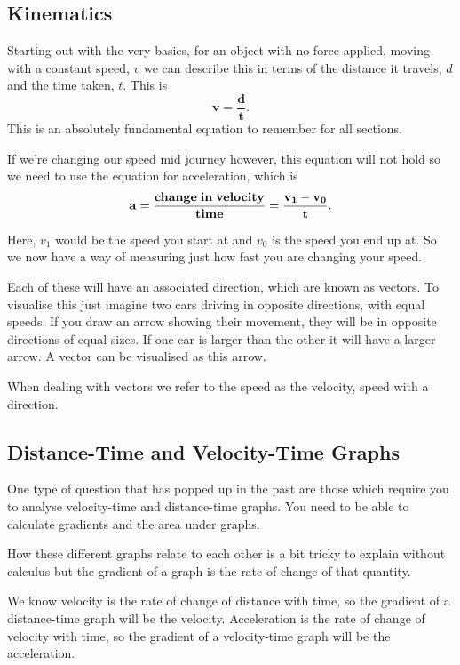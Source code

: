 \documentclass[11pt, titlepage]{article}
\begin{document}
\subsection{Kinematics}
Starting out with the very basics, for an object with no force applied, moving with a constant speed, $v$ we can describe this in terms of the distance it travels, $d$ and the time taken, $t$.  This is 
\begin{equation*}
\mathbf{v = \frac{d}{t}}.
\end{equation*}
This is an absolutely fundamental equation to remember for all sections.

If we're changing our speed mid journey however, this equation will not hold so we need to use the equation for acceleration, which is
\begin{equation*}
\mathbf{a = \frac{\rm{\mathbf{change\; in\; velocity}}}{\rm{\mathbf{time}}} = \frac{v_1 - v_0}{t}}.
\end{equation*}

Here, $v_1$ would be the speed you start at and $v_0$ is the speed you end up at.  So we now have a way of measuring just how fast you are changing your speed.

Each of these will have an associated direction, which are known as vectors.  To visualise this just imagine two cars driving in opposite directions, with equal speeds.  If you draw an arrow showing their movement, they will be in opposite directions of equal sizes.  If one car is larger than the other it will have a larger arrow.  A vector can be visualised as this arrow.

When dealing with vectors we refer to the speed as the velocity, speed with a direction.  

\subsection{Distance-Time and Velocity-Time Graphs}
One type of question that has popped up in the past are those which require you to analyse velocity-time and distance-time graphs.  You need to be able to calculate gradients and the area under graphs.  

How these different graphs relate to each other is a bit tricky to explain without calculus but the gradient of a graph is the rate of change of that quantity.

We know velocity is the rate of change of distance with time, so the gradient of a distance-time graph will be the velocity.  Acceleration is the rate of change of velocity with time, so the gradient of a velocity-time graph will be the acceleration.  
\end{document}

